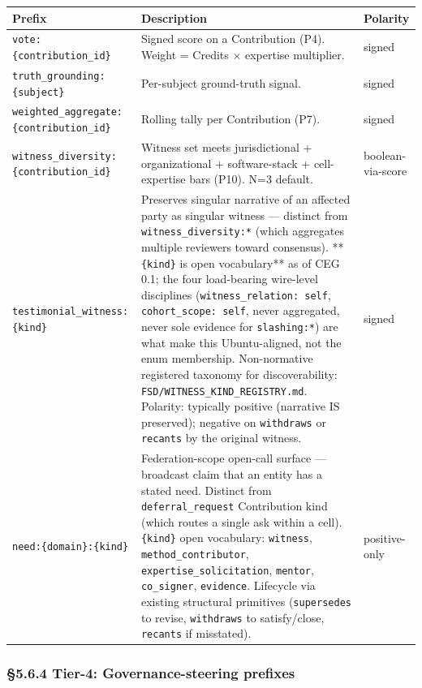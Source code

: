 \documentclass[11pt]{article}
\begin{document}
{\footnotesize
\begin{longtable}{|p{5.33cm}|p{5.33cm}|p{5.33cm}|}\hline
\textbf{Prefix} & \textbf{Description} & \textbf{Polarity} \\ \hline\endhead
\texttt{vote:\{contribution\_id\}} & Signed score on a Contribution (P4). Weight = Credits × expertise multiplier. & signed \\ \hline
\texttt{truth\_grounding:\{subject\}} & Per-subject ground-truth signal. & signed \\ \hline
\texttt{weighted\_aggregate:\{contribution\_id\}} & Rolling tally per Contribution (P7). & signed \\ \hline
\texttt{witness\_diversity:\{contribution\_id\}} & Witness set meets jurisdictional + organizational + software-stack + cell-expertise bars (P10). N=3 default. & boolean-via-score \\ \hline
\texttt{testimonial\_witness:\{kind\}} & Preserves singular narrative of an affected party as singular witness — distinct from \texttt{witness\_diversity:*} (which aggregates multiple reviewers toward consensus). **\texttt{\{kind\}} is open vocabulary** as of CEG 0.1; the four load-bearing wire-level disciplines (\texttt{witness\_relation: self}, \texttt{cohort\_scope: self}, never aggregated, never sole evidence for \texttt{slashing:*}) are what make this Ubuntu-aligned, not the enum membership. Non-normative registered taxonomy for discoverability: \texttt{FSD/WITNESS\_KIND\_REGISTRY.md}. Polarity: typically positive (narrative IS preserved); negative on \texttt{withdraws} or \texttt{recants} by the original witness. & signed \\ \hline
\texttt{need:\{domain\}:\{kind\}} & Federation-scope open-call surface — broadcast claim that an entity has a stated need. Distinct from \texttt{deferral\_request} Contribution kind (which routes a single ask within a cell). \texttt{\{kind\}} open vocabulary: \texttt{witness}, \texttt{method\_contributor}, \texttt{expertise\_solicitation}, \texttt{mentor}, \texttt{co\_signer}, \texttt{evidence}. Lifecycle via existing structural primitives (\texttt{supersedes} to revise, \texttt{withdraws} to satisfy/close, \texttt{recants} if misstated). & positive-only \\ \hline
\end{longtable}}


\subsubsection*{§5.6.4 Tier-4: Governance-steering prefixes}
\end{document}
